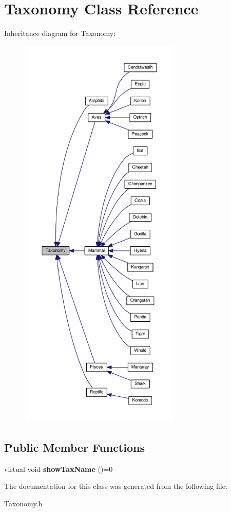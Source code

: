 \hypertarget{classTaxonomy}{}\section{Taxonomy Class Reference}
\label{classTaxonomy}


Inheritance diagram for Taxonomy\+:
\nopagebreak
\begin{figure}[H]
\begin{center}
\leavevmode
\includegraphics[height=550pt]{classTaxonomy__inherit__graph}
\end{center}
\end{figure}
\subsection*{Public Member Functions}
\begin{DoxyCompactItemize}
\item 
virtual void {\bfseries show\+Tax\+Name} ()=0\hypertarget{classTaxonomy_aedc7597a50cc7fd4d6bdcbe370e8a414}{}\label{classTaxonomy_aedc7597a50cc7fd4d6bdcbe370e8a414}

\end{DoxyCompactItemize}


The documentation for this class was generated from the following file\+:\begin{DoxyCompactItemize}
\item 
Taxonomy.\+h\end{DoxyCompactItemize}

